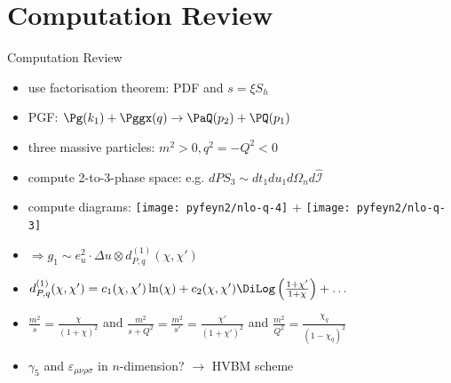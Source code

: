 \section{Computation Review}
\begin{frame}{Computation Review}
\begin{itemize}
\item use factorisation theorem: PDF and $s=\xi S_h$
\item PGF: $\Pg(k_1) + \Pggx(q) \to \PaQ(p_2) + \PQ(p_1)$
\item three massive particles: $m^2>0,q^2=-Q^2<0$
\item<2-> compute 2-to-3-phase space: e.g. $dPS_3 \sim dt_1du_1d\Omega_nd\hat{\mathcal{I}}$ 
\item<2-> compute diagrams: \texttt{[image: pyfeyn2/nlo-q-4]} + \texttt{[image: pyfeyn2/nlo-q-3]}
\item<3-> $\Rightarrow g_1 \sim e_u^2\cdot \Delta u \otimes d_{P,q}^{(1)}(\chi,\chi')$
\item<3-> $d_{P,q}^{(1)}(\chi,\chi') = c_1(\chi,\chi')\ln(\chi) + c_2(\chi,\chi')\DiLog\left(\frac{1+\chi'}{1+\chi}\right)+\ldots$ \checkmark {}
\item<3-> $\frac{m^2}{s} = \frac{\chi}{(1+\chi)^2}$ and $\frac{m^2}{s+Q^2} = \frac{m^2}{s'} = \frac{\chi'}{(1+\chi')^2}$ and $\frac{m^2}{Q^2} = \frac{\chi_q}{(1-\chi_q)^2}$
\item<4-> $\gamma_5$ and $\varepsilon_{\mu\nu\rho\sigma}$ in $n$-dimension? $\to$ HVBM scheme 
\end{itemize}
\end{frame}


